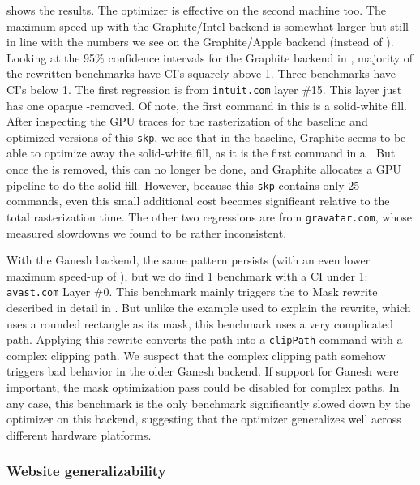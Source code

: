 \documentclass[main.tex]{subfiles}
\begin{document}
 shows the results.
The optimizer is effective on the second machine too.
The maximum speed-up with the Graphite/Intel backend
  is somewhat larger but still in line with the numbers we see on the Graphite/Apple backend
  (\graphiteIntelMaxSpeedupMatched instead of \graphiteAppleMaxSpeedupMatched).
Looking at the 95\% confidence intervals for the Graphite backend in ,
  majority of the rewritten benchmarks have CI's squarely above 1\texttimes.
Three benchmarks have CI's below 1\texttimes.
The first regression is from \texttt{intuit.com} layer \#15.
This layer just has one opaque \SrcOver-\SaveLayer removed.
Of note, the first \Draw command in this \SaveLayer is a solid-white fill.
After inspecting the GPU traces for the rasterization of the baseline and optimized versions of this \texttt{skp},
  we see that in the baseline, Graphite seems to be able to optimize away the solid-white fill,
  as it is the first command in a \Layer.
But once the \SaveLayer is removed, this can no longer be done,
  and Graphite allocates a GPU pipeline to do the solid fill.
However, because this \texttt{skp} contains only 25 commands,
  even this small additional cost becomes significant relative to the total rasterization time.
The other two regressions are from \texttt{gravatar.com},
  whose measured slowdowns we found to be rather inconsistent.

With the Ganesh backend,
  the same pattern persists
  (with an even lower maximum speed-up of \ganeshIntelMaxSpeedupMatched),
  but we do find 1 benchmark with a CI under 1\texttimes: \texttt{avast.com} Layer \#0.
This benchmark mainly triggers the \DstIn to Mask rewrite described in detail in .
But unlike the example used to explain the rewrite,
  which uses a rounded rectangle as its mask,
  this benchmark uses a very complicated path.
Applying this rewrite converts the path into a
  \texttt{clipPath} command with a complex clipping path.
We suspect that the complex clipping path
  somehow triggers bad behavior
  in the older Ganesh backend.
If support for Ganesh were important,
  the \DstIn mask optimization pass
  could be disabled for complex paths.
In any case, this benchmark is
  the only benchmark significantly slowed down by the optimizer on this backend,
  suggesting that the optimizer generalizes well
  across different hardware platforms.

\subsubsection{Website generalizability}
\end{document}
